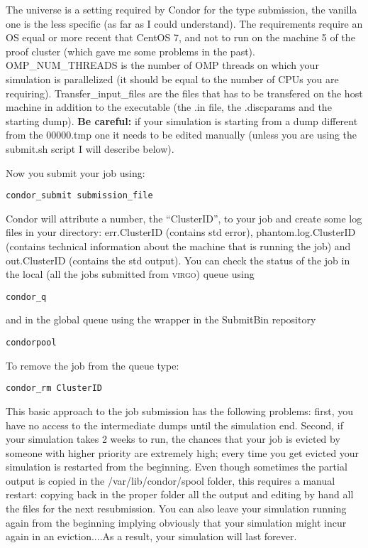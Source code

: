 \documentclass[10pt,a4paper,twoside]{article} %
\begin{document}
The universe is a setting required by Condor for the type submission, the vanilla one is the less specific (as far as I could understand). The requirements require an OS equal or more recent that CentOS 7, and not to run on the machine 5 of the proof cluster (which gave me some problems in the past). OMP\_NUM\_THREADS is the number of OMP threads on which your simulation is parallelized (it should be equal to the number of CPUs you are requiring). Transfer\_input\_files are the files that has to be transfered on the host machine in addition to the executable (the .in file, the .discparams and the starting dump). \textbf{Be careful:} if your simulation is starting from a dump different from the 00000.tmp one it needs to be edited manually (unless you are using the submit.sh script I will describe below).

Now you submit your job using:
\begin{verbatim}
condor_submit submission_file
\end{verbatim}
Condor will attribute a number, the ``ClusterID'', to your job and create some log files in your directory: err.ClusterID (contains std error), phantom.log.ClusterID (contains technical information about the machine that is running the job) and out.ClusterID (contains the std output). You can check the status of the job in the local (all the jobs submitted from \textsc{virgo}) queue using
\begin{verbatim}
condor_q
\end{verbatim}
and in the global queue using the wrapper in the SubmitBin repository
\begin{verbatim}
condorpool
\end{verbatim}
To remove the job from the queue type:
\begin{verbatim}
condor_rm ClusterID
\end{verbatim}

This basic approach to the job submission has the following problems: first, you have no access to the intermediate dumps until the simulation end. Second, if your simulation takes 2 weeks to run, the chances that your job is evicted by someone with higher priority are extremely high; every time you get evicted your simulation is restarted from the beginning. Even though sometimes the partial output is copied in the /var/lib/condor/spool folder, this requires a manual restart: copying back in the proper folder all the output and editing by hand all the files for the next resubmission. You can also leave your simulation running again from the beginning implying obviously that your simulation might incur again in an eviction....As a result, your simulation will last forever.
\end{document}
